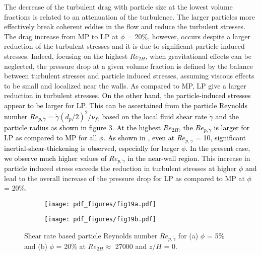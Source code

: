 \documentclass{jfm}
\def\sz#1{{\textcolor{black}{#1}}}
\begin{document}
The decrease of the turbulent drag with particle size
at the lowest volume fractions is related to an attenuation of the turbulence. The larger particles more effectively break coherent eddies in the flow and reduce the turbulent stresses.
The drag increase from MP to LP at $\phi$ = 20\%, however, occurs despite a larger reduction of the turbulent stresses and it is due to significant particle induced stresses. 
Indeed, focusing on the highest $Re_{2H}$, when gravitational effects can be neglected, the pressure drop at a given volume fraction is defined by the balance between turbulent stresses and particle induced stresses, assuming viscous effects to be small and localized near the walls. As compared to MP, LP give a larger reduction in turbulent stresses. \sz{On the other hand, the particle-induced stresses appear to be larger for LP. This can be ascertained from the particle Reynolds number $Re_{p,\dot{\gamma}} = \dot{\gamma}(d_p/2)^2/\nu_f$, based on the local fluid shear rate $\dot{\gamma}$ and the particle radius as shown in figure \ref{fig:Re_p_gamma}. At the highest $Re_{2H}$, the $Re_{p,\dot{\gamma}}$ is larger for LP as compared to MP for all $\phi$. As shown in \cite{picano2013shear}, even at $Re_{p,\dot{\gamma}}$ = 10, significant inertial-shear-thickening is observed, especially for larger $\phi$. In the present case, we observe much higher values of $Re_{p,\dot{\gamma}}$ in the near-wall region.} This increase in particle induced stress exceeds the reduction in turbulent stresses at higher
 $\phi$ and lead to the overall increase of the pressure drop for LP as compared to MP at $\phi$ = 20\%.

\begin{figure}
\centering

\begin{subfigure}{.49\textwidth}
  \centering
  \texttt{[image: pdf\_figures/fig19a.pdf]}
  \caption{}
  \label{fig:Re_p_gamma_5p}
\end{subfigure}%
\begin{subfigure}{.49\textwidth}
  \centering
  \texttt{[image: pdf\_figures/fig19b.pdf]}
  \caption{}
  \label{fig:Re_p_gamma_20p}
\end{subfigure}

\caption{Shear rate based particle Reynolds number $Re_{p,\dot{\gamma}}$ for (a) $\phi$ = 5\% and (b) $\phi$ = 20\% at $Re_{2H}\approx$ 27000 and $z/H$ = 0.}
\label{fig:Re_p_gamma}
\end{figure}
\end{document}
